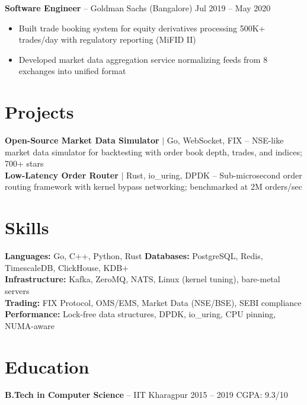 \documentclass[10pt,a4paper]{article}
\begin{document}
\textbf{Software Engineer} -- Goldman Sachs (Bangalore) \hfill {\color{accent}\small Jul 2019 -- May 2020}
\begin{itemize}
    \item Built trade booking system for equity derivatives processing 500K+ trades/day with regulatory reporting (MiFID II)
    \item Developed market data aggregation service normalizing feeds from 8 exchanges into unified format
\end{itemize}

\section{Projects}

\textbf{Open-Source Market Data Simulator} {\small$\mid$ Go, WebSocket, FIX} -- NSE-like market data simulator for backtesting with order book depth, trades, and indices; 700+ stars\\[3pt]
\textbf{Low-Latency Order Router} {\small$\mid$ Rust, io\_uring, DPDK} -- Sub-microsecond order routing framework with kernel bypass networking; benchmarked at 2M orders/sec

\section{Skills}

{\small
\textbf{Languages:} Go, C++, Python, Rust \quad \textbf{Databases:} PostgreSQL, Redis, TimescaleDB, ClickHouse, KDB+\\
\textbf{Infrastructure:} Kafka, ZeroMQ, NATS, Linux (kernel tuning), bare-metal servers\\
\textbf{Trading:} FIX Protocol, OMS/EMS, Market Data (NSE/BSE), SEBI compliance\\
\textbf{Performance:} Lock-free data structures, DPDK, io\_uring, CPU pinning, NUMA-aware
}

\section{Education}

\textbf{B.Tech in Computer Science} -- IIT Kharagpur \hfill 2015 -- 2019 \quad CGPA: 9.3/10
\end{document}
